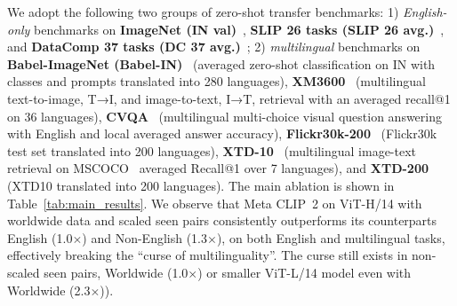 We adopt the following two groups of zero-shot transfer benchmarks: 1) \textit{English-only} benchmarks on \textbf{ImageNet (IN val)}~\citep{russakovsky2015imagenet}, 
\textbf{SLIP 26 tasks (SLIP 26 avg.)}~\citep{mu2021slip},
and \textbf{DataComp 37 tasks (DC 37 avg.)}~\citep{gadre2023datacomp};
2) \textit{multilingual} benchmarks on \textbf{Babel-ImageNet (Babel-IN)}~\citep{geigle2024babel} (averaged zero-shot classification on IN with classes and prompts translated into 280 languages), 
\textbf{XM3600}~\citep{thapliyal2022crossmodal} (multilingual text-to-image, T→I, and image-to-text, I→T, retrieval with an averaged  recall@1 on 36 languages),
\textbf{CVQA}~\citep{mogrovejo2024cvqa} (multilingual multi-choice visual question answering with English and local averaged answer accuracy),
\textbf{Flickr30k-200}~\citep{visheratin2023nllb} (Flickr30k test set translated into 200 languages), 
\textbf{XTD-10}~\citep{aggarwal2020towards} (multilingual image-text retrieval on MSCOCO~\citep{chen2015microsoft} averaged Recall@1 over 7 languages), and \textbf{XTD-200}~\citep{visheratin2023nllb} (XTD10 translated into 200 languages). The main ablation is shown in Table~\ref{tab:main_results}. We observe that Meta CLIP~2 on ViT-H/14 with worldwide data and scaled seen pairs consistently outperforms its counterparts English (1.0$\times$) and Non-English (1.3$\times$), on both English and multilingual tasks, effectively breaking the
``curse of multilinguality''. The curse still exists in non-scaled seen pairs, Worldwide (1.0$\times$) or smaller ViT-L/14 model even with Worldwide (2.3$\times$)).

